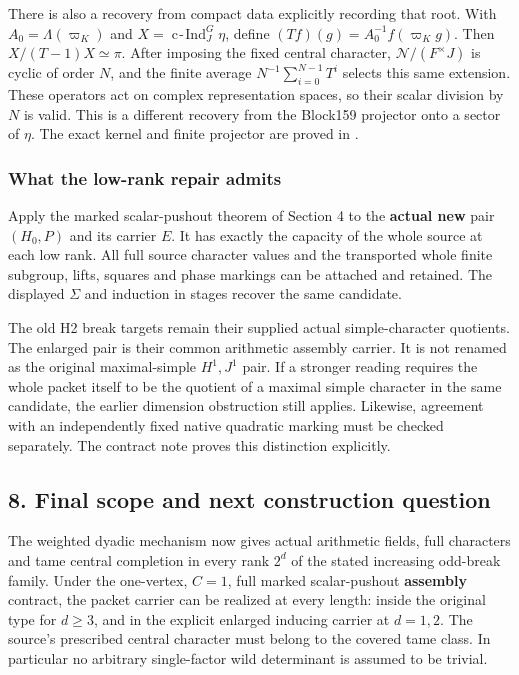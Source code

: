 There is also a recovery from compact data explicitly recording that
root. With \(A_0=\Lambda(\varpi_K)\) and
\(X=\operatorname{c\!-\!Ind}_J^G\eta\), define
\((Tf)(g)=A_0^{-1}f(\varpi_Kg)\). Then \(X/(T-1)X\simeq\pi\). After
imposing the fixed central character, \(\mathcal N/(F^\times J)\) is
cyclic of order \(N\), and the finite average
\(N^{-1}\sum_{i=0}^{N-1}T^i\) selects this same extension. These
operators act on complex representation spaces, so their scalar division
by \(N\) is valid. This is a different recovery from the Block159
projector onto a sector of \(\eta\). The exact kernel and finite
projector are proved in
.

\hypertarget{dyadic_synthesis-what-the-low-rank-repair-admits}{%
\subsubsection{What the low-rank repair
admits}\label{dyadic_synthesis-what-the-low-rank-repair-admits}}

Apply the marked scalar-pushout theorem of Section 4 to the
\textbf{actual new} pair \((H_0,P)\) and its carrier \(E\). It has
exactly the capacity of the whole source at each low rank. All full
source character values and the transported whole finite subgroup,
lifts, squares and phase markings can be attached and retained. The
displayed \(\Sigma\) and induction in stages recover the same candidate.

The old H2 break targets remain their supplied actual simple-character
quotients. The enlarged pair is their common arithmetic assembly carrier. It is not renamed as the original maximal-simple \(H^1,J^1\)
pair. If a stronger reading requires the whole packet itself to be the
quotient of a maximal simple character in the same candidate, the
earlier dimension obstruction still applies. Likewise, agreement with an
independently fixed native quadratic marking must be checked separately.
The contract note proves this distinction explicitly.

\hypertarget{dyadic_synthesis-final-scope-and-next-construction-question}{%
\subsection{8. Final scope and next construction
question}\label{dyadic_synthesis-final-scope-and-next-construction-question}}

The weighted dyadic mechanism now gives actual arithmetic fields, full
characters and tame central completion in every rank \(2^d\) of the
stated increasing odd-break family. Under the one-vertex, \(C=1\), full
marked scalar-pushout \textbf{assembly} contract, the packet carrier can
be realized at every length: inside the original type for \(d\ge3\), and
in the explicit enlarged inducing carrier at \(d=1,2\). The source's
prescribed central character must belong to the covered tame class. In
particular no arbitrary single-factor wild determinant is assumed to be
trivial.

